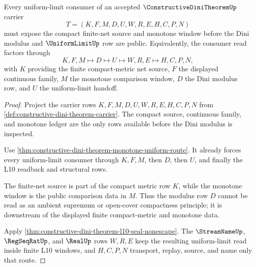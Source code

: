 \begin{theorem}
\label{thm:constructive-dini-theorem-finite-net-monotone-window}
Every uniform-limit consumer of an accepted $\ConstructiveDiniTheoremUp$ carrier
$$
T=(K,F,M,D,U,W,R,E,H,C,P,N)
$$
must expose the compact finite-net source and monotone window before the Dini modulus and $\UniformLimitUp$ row are public. Equivalently, the consumer read factors through
$$
K,F,M \longmapsto D \longmapsto U \longmapsto W,R,E \longmapsto H,C,P,N,
$$
with $K$ providing the finite compact-metric net source, $F$ the displayed continuous family, $M$ the monotone comparison window, $D$ the Dini modulus row, and $U$ the uniform-limit handoff.
\end{theorem}
\begin{proof}
Project the carrier rows $K,F,M,D,U,W,R,E,H,C,P,N$ from \autoref{def:constructive-dini-theorem-carrier}. The compact source, continuous family, and monotone ledger are the only rows available before the Dini modulus is inspected.

Use \autoref{thm:constructive-dini-theorem-monotone-uniform-route}. It already forces every uniform-limit consumer through $K,F,M$, then $D$, then $U$, and finally the L10 readback and structural rows.

The finite-net source is part of the compact metric row $K$, while the monotone window is the public comparison data in $M$. Thus the modulus row $D$ cannot be read as an ambient supremum or open-cover compactness principle; it is downstream of the displayed finite compact-metric and monotone data.

Apply \autoref{thm:constructive-dini-theorem-l10-seal-nonescape}. The $\StreamNameUp$, $\RegSeqRatUp$, and $\RealUp$ rows $W,R,E$ keep the resulting uniform-limit read inside finite L10 windows, and $H,C,P,N$ transport, replay, source, and name only that route.
\end{proof}

